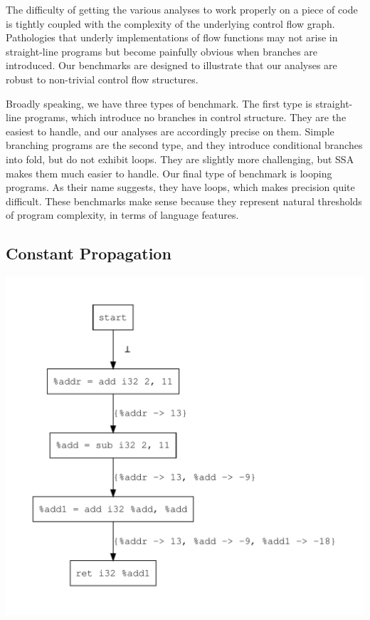 \documentclass{article}
\theoremstyle{definition}
\begin{document}
The difficulty of getting the various analyses to work properly on a
piece of code is tightly coupled with the complexity of the underlying
control flow graph. Pathologies that underly implementations of flow
functions may not arise in straight-line programs but become painfully
obvious when branches are introduced. Our benchmarks are designed to
illustrate that our analyses are robust to non-trivial control flow
structures.

Broadly speaking, we have three types of benchmark. The first type is
straight-line programs, which introduce no branches in control
structure. They are the easiest to handle, and our analyses are
accordingly precise on them. Simple branching programs are the second
type, and they introduce conditional branches into fold, but do not
exhibit loops. They are slightly more challenging, but SSA makes them
much easier to handle. Our final type of benchmark is looping
programs. As their name suggests, they have loops, which makes
precision quite difficult. These benchmarks make sense because they
represent natural thresholds of program complexity, in terms of
language features.

\subsection{Constant Propagation}
\begin{center}
  \includegraphics[scale=.4]{figures/cp/simple_add/simple_add.pdf}
\end{center}
\end{document}
